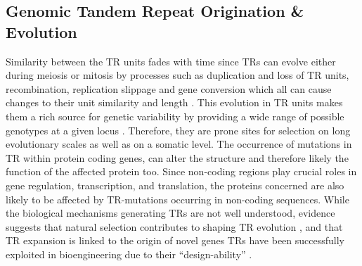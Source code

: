 \documentclass[a4,center,fleqn]{NAR}
\begin{document}
\subsection{Genomic Tandem Repeat Origination \& Evolution}
Similarity between the TR units fades with time since TRs can evolve either during meiosis or mitosis by processes such as duplication and loss of TR units, recombination, replication slippage and gene conversion which all can cause changes to their unit similarity and length \cite{Ellegren2004}. This evolution in TR units makes them a rich source for genetic variability by providing a wide range of possible genotypes at a given locus \cite{Nithianantharajah2007}. Therefore, they are prone sites for selection on long evolutionary scales as well as on a somatic level. The occurrence of mutations in TR within protein coding genes, can alter the structure and therefore likely the function of the affected protein too. Since non-coding regions play crucial roles in gene regulation, transcription, and translation, the proteins concerned are also likely to be affected by TR-mutations occurring in non-coding sequences.
While the biological mechanisms generating TRs are not well understood, evidence suggests that natural selection contributes to shaping TR evolution \cite{Schaper2014},
and that TR expansion is linked to the origin of novel genes \cite{Light2014}
TRs have been successfully exploited in bioengineering due to their “design-ability” \cite{Javadi2013}.
\end{document}
